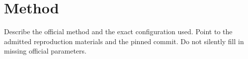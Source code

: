 \section{Method}
\label{sec:method}
Describe the official method and the exact configuration used. Point to the admitted reproduction
materials and the pinned commit. Do not silently fill in missing official parameters.
